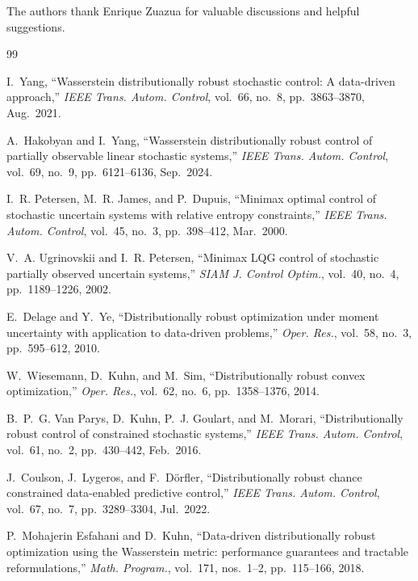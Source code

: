 \documentclass[10pt,journal,twoside]{IEEEtran}
\theoremstyle{definition}
\theoremstyle{remark}
\begin{document}
The authors thank Enrique Zuazua for valuable discussions and helpful
suggestions.






\begin{thebibliography}{99}
	

I.~Yang,
\newblock ``Wasserstein distributionally robust stochastic control: A
data-driven approach,''
\newblock \emph{IEEE Trans. Autom. Control}, vol.~66, no.~8,
pp.~3863--3870, Aug.~2021.

A.~Hakobyan and I.~Yang,
\newblock ``Wasserstein distributionally robust control of partially
observable linear stochastic systems,''
\newblock \emph{IEEE Trans. Autom. Control}, vol.~69, no.~9,
pp.~6121--6136, Sep.~2024.

I.~R. Petersen, M.~R. James, and P.~Dupuis,
\newblock ``Minimax optimal control of stochastic uncertain systems with
relative entropy constraints,''
\newblock \emph{IEEE Trans. Autom. Control}, vol.~45, no.~3,
pp.~398--412, Mar.~2000.

V.~A. Ugrinovskii and I.~R. Petersen,
\newblock ``Minimax LQG control of stochastic partially observed uncertain
systems,''
\newblock \emph{SIAM J. Control Optim.}, vol.~40, no.~4,
pp.~1189--1226, 2002.

E.~Delage and Y.~Ye,
\newblock ``Distributionally robust optimization under moment uncertainty
with application to data-driven problems,''
\newblock \emph{Oper. Res.}, vol.~58, no.~3, pp.~595--612, 2010.

W.~Wiesemann, D.~Kuhn, and M.~Sim,
\newblock ``Distributionally robust convex optimization,''
\newblock \emph{Oper. Res.}, vol.~62, no.~6, pp.~1358--1376, 2014.

B.~P.~G. Van Parys, D.~Kuhn, P.~J. Goulart, and M.~Morari,
\newblock ``Distributionally robust control of constrained stochastic
systems,''
\newblock \emph{IEEE Trans. Autom. Control}, vol.~61, no.~2,
pp.~430--442, Feb.~2016.

J.~Coulson, J.~Lygeros, and F.~D{\"o}rfler,
\newblock ``Distributionally robust chance constrained data-enabled
predictive control,''
\newblock \emph{IEEE Trans. Autom. Control}, vol.~67, no.~7,
pp.~3289--3304, Jul.~2022.

P.~Mohajerin Esfahani and D.~Kuhn,
\newblock ``Data-driven distributionally robust optimization using the
Wasserstein metric: performance guarantees and tractable reformulations,''
\newblock \emph{Math. Program.}, vol.~171, nos.~1--2,
pp.~115--166, 2018.


\end{thebibliography}
\end{document}
